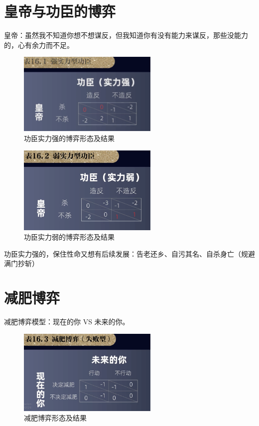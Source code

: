 \documentclass[12pt, a4paper]{article}
\begin{document}
\begin{CJK*}{UTF8}{gbsn}
        \section{皇帝与功臣的博弈}
        皇帝：虽然我不知道你想不想谋反，但我知道你有没有能力来谋反，那些没能力的，心有余力而不足。

        \begin{figure}[htbp]
            \centering
			\includegraphics[width=0.6\textwidth]{./figures/catch2023-08-01-23.30.50.png}
            \caption{功臣实力强的博弈形态及结果}
        \end{figure}

        \begin{figure}[htbp]
            \centering
			\includegraphics[width=0.6\textwidth]{./figures/catch2023-08-01-23.40.21.png}
            \caption{功臣实力弱的博弈形态及结果}
        \end{figure}

        功臣实力强的，保住性命又想有后续发展：告老还乡、自污其名、自杀身亡（规避满门抄斩）

        \clearpage
        \section{减肥博弈}
        减肥博弈模型：现在的你 VS 未来的你。

        \begin{figure}[htbp]
            \centering
			\includegraphics[width=0.6\textwidth]{./figures/catch2023-08-02-00.01.50.png}
            \caption{减肥博弈形态及结果}
        \end{figure}


\end{CJK*}
\end{document}
